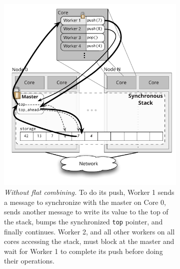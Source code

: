 \begin{figure}[t]
  \centering
  \begin{subfigure}[b]{0.43\textwidth}
    \includegraphics[width=\textwidth]{figs/stack_nofc.pdf}
    \caption{\emph{Without flat combining.}
      To do its push, Worker 1 sends a message to synchronize with the master on Core 0, sends another message to write its value to the top of the stack, bumps the synchronized \texttt{top} pointer, and finally continues. Worker 2, and all other workers on all cores accessing the stack, must block at the master and wait for Worker 1 to complete its push before doing their operations.
    }
    \label{fig:stacknofc}
  \end{subfigure}%
  \hspace{0.05\textwidth}
  \begin{subfigure}[b]{0.43\textwidth}
    \centering

\end{subfigure}
\end{figure}
